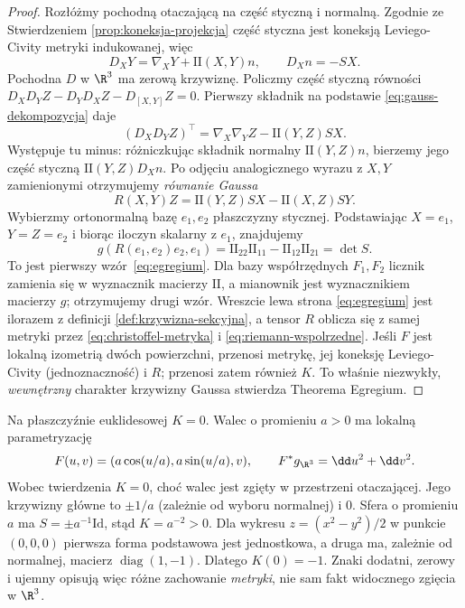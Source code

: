 \begin{proof}
Rozłóżmy pochodną otaczającą na część styczną
i normalną. Zgodnie ze Stwierdzeniem
\ref{prop:koneksja-projekcja} część styczna jest
koneksją Leviego-Civity metryki indukowanej, więc
\begin{equation}\label{eq:gauss-dekompozycja}
 D_XY=\nabla_XY+\mathrm{II}(X,Y)n,
 \qquad D_Xn=-S X.
\end{equation}
Pochodna $D$ w $\R^3$ ma zerową krzywiznę.
Policzmy część styczną równości
$D_XD_YZ-D_YD_XZ-D_{[X,Y]}Z=0$.
Pierwszy składnik na podstawie
\eqref{eq:gauss-dekompozycja} daje
\[
 (D_XD_YZ)^\top
 =\nabla_X\nabla_YZ-\mathrm{II}(Y,Z)SX.
\]
Występuje tu minus: różniczkując składnik
normalny $\mathrm{II}(Y,Z)n$, bierzemy jego część
styczną $\mathrm{II}(Y,Z)D_Xn$.
Po odjęciu analogicznego wyrazu z $X,Y$
zamienionymi otrzymujemy \emph{równanie Gaussa}
\begin{equation}\label{eq:gauss-rownanie}
 R(X,Y)Z=\mathrm{II}(Y,Z)SX
                       -\mathrm{II}(X,Z)SY.
\end{equation}
Wybierzmy ortonormalną bazę $e_1,e_2$ płaszczyzny
stycznej. Podstawiając $X=e_1$, $Y=Z=e_2$
i biorąc iloczyn skalarny z $e_1$, znajdujemy
\[
 g(R(e_1,e_2)e_2,e_1)
 =\mathrm{II}_{22}\mathrm{II}_{11}
      -\mathrm{II}_{12}\mathrm{II}_{21}=\det S.
\]
To jest pierwszy wzór~\eqref{eq:egregium}.
Dla bazy współrzędnych $F_1,F_2$ licznik
zamienia się w wyznacznik macierzy $\mathrm{II}$,
a mianownik jest wyznacznikiem macierzy $g$;
otrzymujemy drugi wzór. Wreszcie lewa strona
\eqref{eq:egregium} jest ilorazem z definicji
\ref{def:krzywizna-sekcyjna}, a tensor $R$
oblicza się z samej metryki przez
\eqref{eq:christoffel-metryka} i
\eqref{eq:riemann-wspolrzedne}. Jeśli $F$ jest
lokalną izometrią dwóch powierzchni, przenosi
metrykę, jej koneksję Leviego-Civity (jednoznaczność)
i $R$; przenosi zatem również $K$. To właśnie
niezwykły, \emph{wewnętrzny} charakter krzywizny
Gaussa stwierdza Theorema Egregium.
\end{proof}

\begin{przyklad}
\label{prz:egregium-cztery}
Na płaszczyźnie euklidesowej $K=0$. Walec o promieniu
$a>0$ ma lokalną parametryzację
\[
 F(u,v)=(a\cos(u/a),a\sin(u/a),v),
 \qquad F^*g_{\R^3}=\dd u^2+\dd v^2.
\]
Wobec twierdzenia $K=0$, choć walec jest zgięty
w przestrzeni otaczającej. Jego krzywizny główne
to $\pm1/a$ (zależnie od wyboru normalnej) i $0$.
Sfera o promieniu $a$ ma $S=\pm a^{-1}\mathrm{Id}$,
stąd $K=a^{-2}>0$. Dla wykresu
$z=(x^2-y^2)/2$ w punkcie $(0,0,0)$ pierwsza
forma podstawowa jest jednostkowa, a druga ma,
zależnie od normalnej, macierz
$\operatorname{diag}(1,-1)$. Dlatego $K(0)=-1$.
Znaki dodatni, zerowy i ujemny opisują więc
różne zachowanie \emph{metryki}, nie sam fakt
widocznego zgięcia w $\R^3$.
\end{przyklad}

